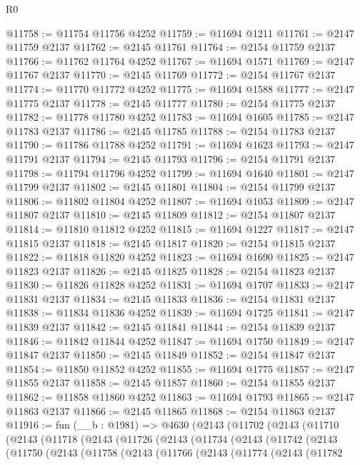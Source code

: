 \begin{lexlean}{R0}
\begin{coremodule}
@11758 := @11754 @11756 @4252
@11759 := @11694 @1211
@11761 := @2147 @11759 @2137
@11762 := @2145 @11761
@11764 := @2154 @11759 @2137
@11766 := @11762 @11764 @4252
@11767 := @11694 @1571
@11769 := @2147 @11767 @2137
@11770 := @2145 @11769
@11772 := @2154 @11767 @2137
@11774 := @11770 @11772 @4252
@11775 := @11694 @1588
@11777 := @2147 @11775 @2137
@11778 := @2145 @11777
@11780 := @2154 @11775 @2137
@11782 := @11778 @11780 @4252
@11783 := @11694 @1605
@11785 := @2147 @11783 @2137
@11786 := @2145 @11785
@11788 := @2154 @11783 @2137
@11790 := @11786 @11788 @4252
@11791 := @11694 @1623
@11793 := @2147 @11791 @2137
@11794 := @2145 @11793
@11796 := @2154 @11791 @2137
@11798 := @11794 @11796 @4252
@11799 := @11694 @1640
@11801 := @2147 @11799 @2137
@11802 := @2145 @11801
@11804 := @2154 @11799 @2137
@11806 := @11802 @11804 @4252
@11807 := @11694 @1053
@11809 := @2147 @11807 @2137
@11810 := @2145 @11809
@11812 := @2154 @11807 @2137
@11814 := @11810 @11812 @4252
@11815 := @11694 @1227
@11817 := @2147 @11815 @2137
@11818 := @2145 @11817
@11820 := @2154 @11815 @2137
@11822 := @11818 @11820 @4252
@11823 := @11694 @1690
@11825 := @2147 @11823 @2137
@11826 := @2145 @11825
@11828 := @2154 @11823 @2137
@11830 := @11826 @11828 @4252
@11831 := @11694 @1707
@11833 := @2147 @11831 @2137
@11834 := @2145 @11833
@11836 := @2154 @11831 @2137
@11838 := @11834 @11836 @4252
@11839 := @11694 @1725
@11841 := @2147 @11839 @2137
@11842 := @2145 @11841
@11844 := @2154 @11839 @2137
@11846 := @11842 @11844 @4252
@11847 := @11694 @1750
@11849 := @2147 @11847 @2137
@11850 := @2145 @11849
@11852 := @2154 @11847 @2137
@11854 := @11850 @11852 @4252
@11855 := @11694 @1775
@11857 := @2147 @11855 @2137
@11858 := @2145 @11857
@11860 := @2154 @11855 @2137
@11862 := @11858 @11860 @4252
@11863 := @11694 @1793
@11865 := @2147 @11863 @2137
@11866 := @2145 @11865
@11868 := @2154 @11863 @2137
@11916 := fun (__b : @1981) =>
  @4630
    (@2143
      (@11702
        (@2143
          (@11710
            (@2143
              (@11718
                (@2143
                  (@11726
                    (@2143
                      (@11734
                        (@2143
                          (@11742
                            (@2143
                              (@11750
                                (@2143
                                  (@11758
                                    (@2143
                                      (@11766
                                        (@2143
                                          (@11774
                                            (@2143
                                              (@11782

\end{coremodule}
\end{lexlean}
